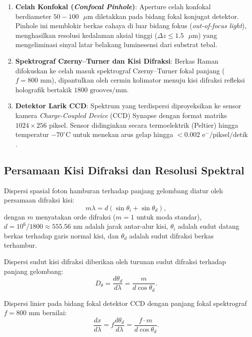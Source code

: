 \begin{enumerate}
    \item \textbf{Celah Konfokal (\textit{Confocal Pinhole})}: Aperture celah konfokal berdiameter $50 - 100\text{ }\mu\text{m}$ diletakkan pada bidang fokal konjugat detektor. Pinhole ini memblokir berkas cahaya di luar bidang fokus (\textit{out-of-focus light}), menghasilkan resolusi kedalaman aksial tinggi ($\Delta z \le 1.5\text{ }\mu\text{m}$) yang mengeliminasi sinyal latar belakang luminesensi dari substrat tebal.
    \item \textbf{Spektrograf Czerny--Turner dan Kisi Difraksi}: Berkas Raman difokuskan ke celah masuk spektrograf Czerny--Turner fokal panjang ($f = 800\text{ mm}$), dipantulkan oleh cermin kolimator menuju kisi difraksi refleksi holografik bertakik $1800\text{ grooves/mm}$.
    \item \textbf{Detektor Larik CCD}: Spektrum yang terdispersi diproyeksikan ke sensor kamera \textit{Charge-Coupled Device} (CCD) Synapse dengan format matriks $1024 \times 256$ piksel. Sensor didinginkan secara termoelektrik (Peltier) hingga temperatur $-70^\circ\text{C}$ untuk menekan arus gelap hingga $< 0.002\text{ e}^-/\text{piksel/detik}$.
\end{enumerate}

\subsection{Persamaan Kisi Difraksi dan Resolusi Spektral}
Dispersi spasial foton hamburan terhadap panjang gelombang diatur oleh persamaan difraksi kisi:
\begin{equation}
m \lambda = d (\sin \theta_i + \sin \theta_d),
\label{eq:persamaan_kisi}
\end{equation}
dengan $m$ menyatakan orde difraksi ($m = 1$ untuk moda standar), $d = 10^6 / 1800 \approx 555.56\text{ nm}$ adalah jarak antar-alur kisi, $\theta_i$ adalah sudut datang berkas terhadap garis normal kisi, dan $\theta_d$ adalah sudut difraksi berkas terhambur.

Dispersi sudut kisi difraksi diberikan oleh turunan sudut difraksi terhadap panjang gelombang:
\begin{equation}
D_{\theta} = \frac{d\theta_d}{d\lambda} = \frac{m}{d \cos \theta_d}.
\label{eq:dispersi_sudut}
\end{equation}

Dispersi linier pada bidang fokal detektor CCD dengan panjang fokal spektrograf $f = 800\text{ mm}$ bernilai:
\begin{equation}
\frac{dx}{d\lambda} = f \frac{d\theta_d}{d\lambda} = \frac{f \cdot m}{d \cos \theta_d}.
\label{eq:dispersi_linier}
\end{equation}

